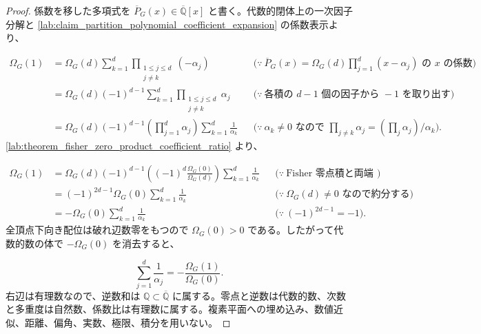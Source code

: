 \documentclass[11pt,a4paper]{article}
\theoremstyle{remark}
\begin{document}
\begin{proof}
係数を移した多項式を
$\overline P_G(x)\in\overline{\mathbb Q}[x]$
 と書く。代数的閉体上の一次因子分解と
\cref{lab:claim_partition_polynomial_coefficient_expansion}
 の係数表示より、

\[\begin{aligned}
\Omega_G(1)
&=
\Omega_G(d)
\sum_{k=1}^{d}
\prod_{\substack{1\le j\le d\\j\ne k}}
(-\alpha_j)
&&\bigl(\because\ \overline P_G(x)=\Omega_G(d)\prod_{j=1}^{d}(x-\alpha_j)\text{ の }x\text{ の係数}\bigr)\\
&=
\Omega_G(d)(-1)^{d-1}
\sum_{k=1}^{d}
\prod_{\substack{1\le j\le d\\j\ne k}}
\alpha_j
&&\bigl(\because\ \text{各積の }d-1\text{ 個の因子から }-1\text{ を取り出す}\bigr)\\
&=
\Omega_G(d)(-1)^{d-1}
\left(\prod_{j=1}^{d}\alpha_j\right)
\sum_{k=1}^{d}\frac{1}{\alpha_k}
&&\bigl(\because\ \alpha_k\ne0\text{ なので }\prod_{j\ne k}\alpha_j=(\prod_j\alpha_j)/\alpha_k\bigr).
\end{aligned}\]
\cref{lab:theorem_fisher_zero_product_coefficient_ratio}
 より、

\[\begin{aligned}
\Omega_G(1)
&=
\Omega_G(d)(-1)^{d-1}
\left(
  (-1)^d\frac{\Omega_G(0)}{\Omega_G(d)}
\right)
\sum_{k=1}^{d}\frac{1}{\alpha_k}
&&\bigl(\because\ \text{Fisher 零点積と両端係数比}\bigr)\\
&=
(-1)^{2d-1}\Omega_G(0)
\sum_{k=1}^{d}\frac{1}{\alpha_k}
&&\bigl(\because\ \Omega_G(d)\ne0\text{ なので約分する}\bigr)\\
&=
-\Omega_G(0)
\sum_{k=1}^{d}\frac{1}{\alpha_k}
&&\bigl(\because\ (-1)^{2d-1}=-1\bigr).
\end{aligned}\]
全頂点下向き配位は破れ辺数零をもつので
$\Omega_G(0)>0$
 である。したがって代数的数の体で
$-\Omega_G(0)$
 を消去すると、

\[\sum_{j=1}^{d}\frac{1}{\alpha_j}
=
-\frac{\Omega_G(1)}{\Omega_G(0)}.\]
右辺は有理数なので、逆数和は
$\mathbb Q\subset\overline{\mathbb Q}$
 に属する。零点と逆数は代数的数、次数と多重度は自然数、係数比は有理数に属する。複素平面への埋め込み、数値近似、距離、偏角、実数、極限、積分を用いない。

\end{proof}
\end{document}
